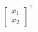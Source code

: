 \documentclass[preview]{standalone}
\begin{document}
\begin{align*}
\begin{bmatrix} x_1 \\ x_2 \end{bmatrix}^\top
\end{align*}
\end{document}
